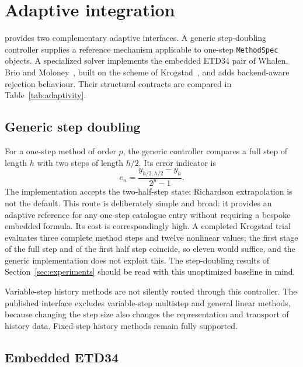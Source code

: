 \section{Adaptive integration}\label{sec:adaptivity}

\pkg{} provides two complementary adaptive interfaces.  A generic step-doubling
controller supplies a reference mechanism applicable to one-step
\texttt{MethodSpec} objects.  A specialized solver implements the embedded
ETD34 pair of Whalen, Brio and Moloney~\cite{WhalenBrioMoloney2015}, built on
the scheme of Krogstad~\cite{Krogstad2005}, and adds backend-aware rejection
behaviour.  Their structural contracts are compared in
Table~\ref{tab:adaptivity}.



\subsection{Generic step doubling}

For a one-step method of order $p$, the generic controller compares a full step
of length $h$ with two steps of length $h/2$.  Its error indicator is
\begin{equation}
  e_n=\frac{y_{h/2,h/2}-y_h}{2^p-1}.
\end{equation}
The implementation accepts the two-half-step state; Richardson extrapolation is
not the default.  This route is deliberately simple and broad: it provides an
adaptive reference for any one-step catalogue entry without requiring a bespoke
embedded formula.  Its cost is correspondingly high.  A completed Krogstad
trial evaluates three complete method steps and twelve nonlinear values; the
first stage of the full step and of the first half step coincide, so eleven
would suffice, and the generic implementation does not exploit this.  The
step-doubling results of Section~\ref{sec:experiments} should be read with this
unoptimized baseline in mind.

Variable-step history methods are not silently routed through this controller.
The published interface excludes variable-step multistep and general linear
methods, because changing the step size also changes the representation and
transport of history data.  Fixed-step history methods remain fully supported.

\subsection{Embedded ETD34}

